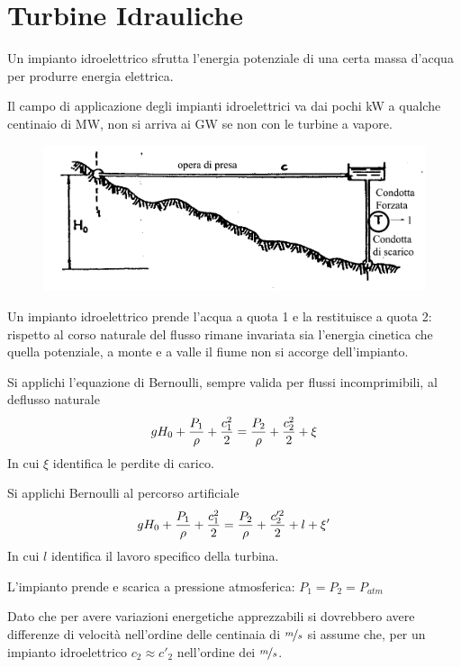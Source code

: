 \documentclass[a4paper, 15pt]{article}
\begin{document}
\part{Turbine Idrauliche}
\begin{adjustwidth}{2in}{}
	
	Un impianto idroelettrico sfrutta l'energia potenziale di una certa massa d'acqua per produrre energia elettrica. \newline 
	
	Il campo di applicazione degli impianti idroelettrici va dai pochi kW a qualche centinaio di MW, non si arriva ai GW se non con le turbine a vapore.	
\begin{figure}[H]
	\centering
	\includegraphics[width=0.7\linewidth]{immagini/caputo1}
	\label{fig:caputo1}
\end{figure}
	Un impianto idroelettrico prende l'acqua a quota 1 e la restituisce a quota 2: rispetto al corso naturale del flusso rimane invariata sia l'energia cinetica che quella potenziale, a monte e a valle il fiume non si accorge dell'impianto. \newline 
	
	Si applichi l'equazione di Bernoulli, sempre valida per flussi incomprimibili, al deflusso naturale
	\[gH_0 + {P_1\over\rho} + {c_1^2\over2} = {P_2\over\rho} + {c_2^2\over2} + \xi\]
	In cui $\xi$ identifica le perdite di carico. \newline 
	
	Si applichi Bernoulli al percorso artificiale
	\[gH_0 + {P_1\over\rho} + {c_1^2\over2} = {P_2\over\rho} + {c_2'^2\over2} + l + \xi'\]
	In cui $l$ identifica il lavoro specifico della turbina. \newline 
	
	L'impianto prende e scarica a pressione atmosferica: $P_1=P_2=P_{atm}$
	
	Dato che per avere variazioni energetiche apprezzabili si dovrebbero avere differenze di velocità nell'ordine delle centinaia di $\nicefrac{m}{s}$ si assume che, per un impianto idroelettrico $c_2 \approx c'_2$ nell'ordine dei $\nicefrac{m}{s}$. \newline 
	

\end{adjustwidth}
\end{document}
